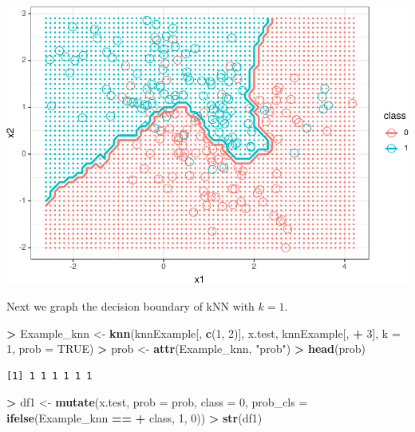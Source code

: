 \documentclass[]{krantz}
\makeatletter
\newenvironment{Shaded}{\begin{snugshade}}{\end{snugshade}}
\newcommand{\DataTypeTok}[1]{\textcolor[rgb]{0.27,0.27,0.27}{#1}}
\newcommand{\DecValTok}[1]{\textcolor[rgb]{0.06,0.06,0.06}{#1}}
\newcommand{\KeywordTok}[1]{\textcolor[rgb]{0.27,0.27,0.27}{\textbf{#1}}}
\newcommand{\NormalTok}[1]{#1}
\newcommand{\OperatorTok}[1]{\textcolor[rgb]{0.43,0.43,0.43}{\textbf{#1}}}
\newcommand{\OtherTok}[1]{\textcolor[rgb]{0.37,0.37,0.37}{#1}}
\newcommand{\StringTok}[1]{\textcolor[rgb]{0.5,0.5,0.5}{#1}}
\newenvironment{kframe}{%
\medskip{}
\setlength{\fboxsep}{.8em}
 \def\at@end@of@kframe{}%
 \ifinner\ifhmode%
  \def\at@end@of@kframe{\end{minipage}}%
  \begin{minipage}{\columnwidth}%
 \fi\fi%
 \def\FrameCommand##1{\hskip\@totalleftmargin \hskip-\fboxsep
 \colorbox{shadecolor}{##1}\hskip-\fboxsep
     \hskip-\linewidth \hskip-\@totalleftmargin \hskip\columnwidth}%
 \MakeFramed {\advance\hsize-\width
   \@totalleftmargin\z@ \linewidth\hsize
   \@setminipage}}%
 {\par\unskip\endMakeFramed%
 \at@end@of@kframe}
\renewenvironment{Shaded}{\begin{kframe}}{\end{kframe}}
\makeatother
\begin{document}
\includegraphics{bookdown_files/figure-latex/unnamed-chunk-239-1.pdf}

Next we graph the decision boundary of kNN with \(k=1\).

\begin{Shaded}
\begin{Highlighting}[]
\OperatorTok{>}\StringTok{ }\NormalTok{Example_knn <-}\StringTok{ }\KeywordTok{knn}\NormalTok{(knnExample[, }\KeywordTok{c}\NormalTok{(}\DecValTok{1}\NormalTok{, }\DecValTok{2}\NormalTok{)], x.test, knnExample[, }
\OperatorTok{+}\StringTok{   }\DecValTok{3}\NormalTok{], }\DataTypeTok{k =} \DecValTok{1}\NormalTok{, }\DataTypeTok{prob =} \OtherTok{TRUE}\NormalTok{)}
\OperatorTok{>}\StringTok{ }\NormalTok{prob <-}\StringTok{ }\KeywordTok{attr}\NormalTok{(Example_knn, }\StringTok{"prob"}\NormalTok{)}
\OperatorTok{>}\StringTok{ }\KeywordTok{head}\NormalTok{(prob)}
\end{Highlighting}
\end{Shaded}

\begin{verbatim}
[1] 1 1 1 1 1 1
\end{verbatim}

\begin{Shaded}
\begin{Highlighting}[]
\OperatorTok{>}\StringTok{ }\NormalTok{df1 <-}\StringTok{ }\KeywordTok{mutate}\NormalTok{(x.test, }\DataTypeTok{prob =}\NormalTok{ prob, }\DataTypeTok{class =} \DecValTok{0}\NormalTok{, }\DataTypeTok{prob_cls =} \KeywordTok{ifelse}\NormalTok{(Example_knn }\OperatorTok{==}\StringTok{ }
\OperatorTok{+}\StringTok{   }\NormalTok{class, }\DecValTok{1}\NormalTok{, }\DecValTok{0}\NormalTok{))}
\OperatorTok{>}\StringTok{ }\KeywordTok{str}\NormalTok{(df1)}
\end{Highlighting}
\end{Shaded}
\end{document}
